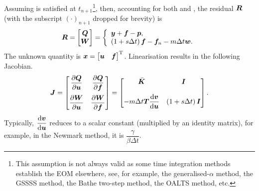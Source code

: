 Assuming  is satisfied at $t_{n+1}$\footnote{This assumption is not always valid as some time integration methods establish the EOM elsewhere, see, for example, the generalised-$\alpha$ method, the GSSSS method, the Bathe two-step method, the OALTS method, etc.}, then, accounting for both  and , the residual $\bm{R}$ (with the subscript $\left(\cdot\right)_{n+1}$ dropped for brevity) is
\begin{gather}\label{eq:residual}
\bm{R}=\begin{bmatrix}
\bm{Q}\\\bm{W}
\end{bmatrix}=\left\{
\begin{array}{l}
\bm{y}+\bm{f}-\bm{p},\\
\left(1+s\Delta{}t\right)\bm{f}-\bm{f}_n-m\Delta{}t\bm{w}.
\end{array}
\right.
\end{gather}
The unknown quantity is $\bm{x}=\begin{bmatrix}
\bm{u}&\bm{f}
\end{bmatrix}^{\mathrm{T}}$. Linearisation results in the following Jacobian.
\begin{gather}
\bm{J}=\begin{bmatrix}
\dfrac{\partial{\bm{Q}}}{\partial{\bm{u}}}&\dfrac{\partial{\bm{Q}}}{\partial{\bm{f}}}\\[4mm]
\dfrac{\partial{\bm{W}}}{\partial{\bm{u}}}&\dfrac{\partial{\bm{W}}}{\partial{\bm{f}}}
\end{bmatrix}=\begin{bmatrix}
\bar{\bm{K}}&\bm{I}\\[4mm]
-m\Delta{}t\bm{T}\dfrac{\mathrm{d}\bm{v}}{\mathrm{d}\bm{u}}&\left(1+s\Delta{}t\right)\bm{I}
\end{bmatrix}.
\end{gather}
Typically, $\dfrac{\mathrm{d}\bm{v}}{\mathrm{d}\bm{u}}$ reduces to a scalar constant (multiplied by an identity matrix), for example, in the Newmark method, it is $\dfrac{\gamma}{\beta\Delta{}t}$.

